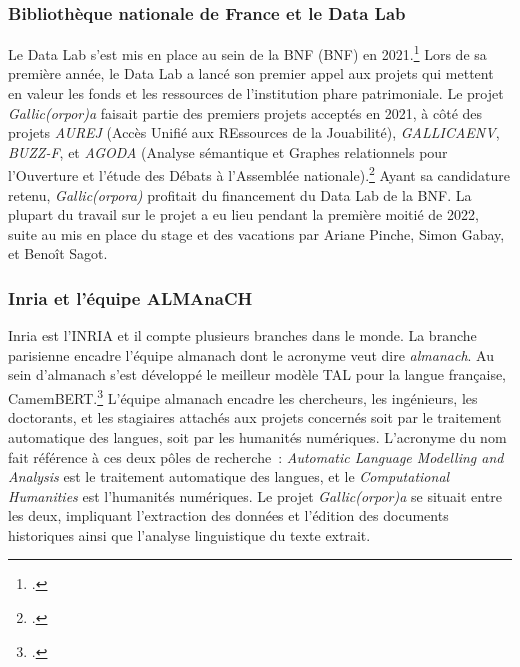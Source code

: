 \documentclass[class=article, crop=false]{standalone}
\begin{document}
\subsubsection{Bibliothèque nationale de France et le Data Lab}
Le Data Lab s'est mis en place au sein de la \acrlong{BNF} (\acrshort{BNF}) en 2021.\footcite{carlinBnFDataLabService2021} Lors de sa première année, le Data Lab a lancé son premier appel aux projets qui mettent en valeur les fonds et les ressources de l'institution phare patrimoniale. Le projet \textit{Gallic(orpor)a} faisait partie des premiers projets acceptés en 2021, à côté des projets \textit{AUREJ} (Accès Unifié aux REssources de la Jouabilité), \textit{GALLICAENV}, \textit{BUZZ-F}, et \textit{AGODA} (Analyse sémantique et Graphes relationnels pour l’Ouverture et l’étude des Débats à l’Assemblée nationale).\footcite[123]{bibliothequenationaledefranceRapportActivite20212022} Ayant sa candidature retenu, \textit{Gallic(orpora)} profitait du financement du Data Lab de la \acrshort{BNF}. La plupart du travail sur le projet a eu lieu pendant la première moitié de 2022, suite au mis en place du stage et des vacations par Ariane Pinche, Simon Gabay, et Benoît Sagot.

\subsubsection{Inria et l'équipe ALMAnaCH}
\Gls{Inria} est l'\acrlong{INRIA} et il compte plusieurs branches dans le monde. La branche parisienne encadre l'équipe \acrshort{almanach} dont le acronyme veut dire \textit{\acrlong{almanach}}. Au sein d'\acrshort{almanach} s'est développé le meilleur modèle \acrshort{TAL} pour la langue française, CamemBERT.\footcite{martinCamemBERTTastyFrench2020} L'équipe \acrshort{almanach} encadre les chercheurs, les ingénieurs, les doctorants, et les stagiaires attachés aux projets concernés soit par le traitement automatique des langues, soit par les humanités numériques. L'acronyme du nom fait référence à ces deux pôles de recherche~: \textit{Automatic Language Modelling and Analysis} est le traitement automatique des langues, et le \textit{Computational Humanities} est l'humanités numériques. Le projet \textit{Gallic(orpor)a} se situait entre les deux, impliquant l'extraction des données et l'édition des documents historiques ainsi que l'analyse linguistique du texte extrait. 
\end{document}
